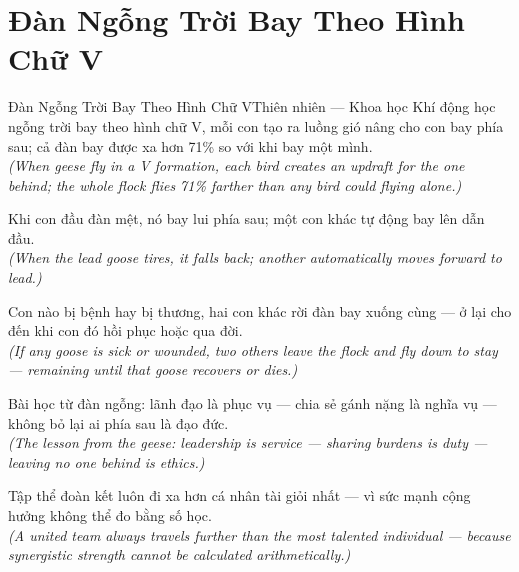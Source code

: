 \section{Đàn Ngỗng Trời Bay Theo Hình Chữ V}
\begin{truyen}{Đàn Ngỗng Trời Bay Theo Hình Chữ V}{Thiên nhiên --- Khoa học Khí động học}
 ngỗng trời bay theo hình chữ V, mỗi con tạo ra luồng gió nâng cho con bay phía sau; cả đàn bay được xa hơn 71\% so với khi bay một mình.\\[4pt]
\textit{(When geese fly in a V formation, each bird creates an updraft for the one behind; the whole flock flies 71\% farther than any bird could flying alone.)}

Khi con đầu đàn mệt, nó bay lui phía sau; một con khác tự động bay lên dẫn đầu.\\[4pt]
\textit{(When the lead goose tires, it falls back; another automatically moves forward to lead.)}

Con nào bị bệnh hay bị thương, hai con khác rời đàn bay xuống cùng --- ở lại cho đến khi con đó hồi phục hoặc qua đời.\\[4pt]
\textit{(If any goose is sick or wounded, two others leave the flock and fly down to stay --- remaining until that goose recovers or dies.)}

Bài học từ đàn ngỗng: lãnh đạo là phục vụ --- chia sẻ gánh nặng là nghĩa vụ --- không bỏ lại ai phía sau là đạo đức.\\[4pt]
\textit{(The lesson from the geese: leadership is service --- sharing burdens is duty --- leaving no one behind is ethics.)}

\end{truyen}
\begin{baihoc}
  Tập thể đoàn kết luôn đi xa hơn cá nhân tài giỏi nhất --- vì sức mạnh cộng hưởng không thể đo bằng số học.\\[4pt]
  \textit{(A united team always travels further than the most talented individual --- because synergistic strength cannot be calculated arithmetically.)}
\end{baihoc}

